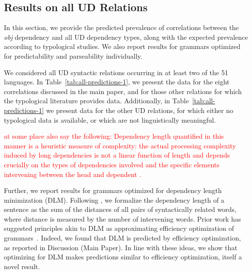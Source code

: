 \documentclass[10pt,twoside,lineno]{article}
\begin{document}
%    
%    
%    



\subsection{Results on all UD Relations}
In this section, we provide the predicted prevalence of correlations between the \emph{obj} dependency and all UD dependency types, along with the expected prevalence according to typological studies.
We also report results for grammars optimized for predictability and parseability individually.


We considered all UD syntactic relations occurring in at least two of the 51 languages.
In Table~\ref{tab:all-predictions-1}, we present the data for the eight correlations discussed in the main paper, and for those other relations for which the typological literature provides data.
Additionally, in Table~\ref{tab:all-predictions-1} we present data for the other UD relations, for which either no typological data is available, or which are not linguistically meaningful.



\textcolor{red}{at some place also say the following: Dependency length quantified in this manner is a heuristic measure of complexity: the actual processing complexity induced by long dependencies is not a linear function of length and depends crucially on the types of dependencies involved \cite{demberg2008data} and the specific elements intervening between the head and dependent \cite{gibson1998linguistic,gibson2000dependency,lewis2005activationbased}. }

Further, we report results for grammars optimized for dependency length minimization (DLM).
Following \cite{futrell2015largescale}, we formalize the dependency length of a sentence as the sum of the distances of all pairs of syntactically related words, where distance is measured by the number of intervening words.
Prior work has suggested principles akin to DLM as approximating efficiency optimization of grammars~\cite{hawkins1994performance,futrell2017memory, futrell2017generalizing}.
Indeed, we found that DLM is predicted by efficiency optimization, as reported in Discussion (Main Paper).
In line with these ideas, we show that optimizing for DLM makes predictions similar to efficiency optimization, itself a novel result.
\end{document}
